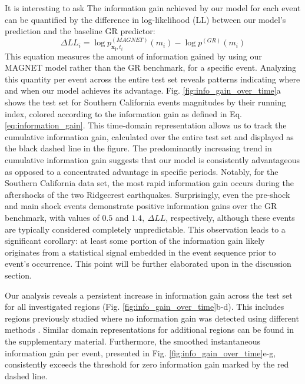 \documentclass[pdflatex]{sn-jnl}
\begin{document}
It is interesting to ask The information gain achieved by our model for each event can be quantified by the difference in log-likelihood (LL) between our model's prediction and the baseline GR predictor:
\begin{equation}
    \Delta LL_i = \log{p_{\pmb{x_i}, t_i}^{(MAGNET)}(m_i)} - \log{p^{(GR)}(m_i)}
    \label{eq:information_gain}
\end{equation}
This equation measures the amount of information gained by using our MAGNET model rather than the GR benchmark, for a specific event. Analyzing this quantity per event across the entire test set reveals patterns indicating where and when our model achieves its advantage. Fig. \ref{fig:info_gain_over_time}a shows the test set for Southern California events magnitudes by their running index, colored according to the information gain as defined in Eq. \ref{eq:information_gain}. This time-domain representation allows us to track the cumulative information gain, calculated over the entire test set and displayed as the black dashed line in the figure. The predominantly increasing trend in cumulative information gain suggests that our model is consistently advantageous as opposed to a concentrated advantage in specific periods. Notably, for the Southern California data set, the most rapid information gain occurs during the aftershocks of the two Ridgecrest earthquakes. Surprisingly, even the pre-shock and main shock events demonstrate positive information gains over the GR benchmark, with values of $0.5$ and $1.4, \ \Delta LL$, respectively, although these events are typically considered completely unpredictable. This observation leads to a significant corollary: at least some portion of the information gain likely originates from a statistical signal embedded in the event sequence prior to event's occurrence. This point will be further elaborated upon in the discussion section.
\newline

Our analysis reveals a persistent increase in information gain across the test set for all investigated regions (Fig. \ref{fig:info_gain_over_time}b-d). This includes regions previously studied where no information gain was detected using different methods  \cite{ogata_exploring_2018}. Similar domain representations for additional regions can be found in the supplementary material. Furthermore, the smoothed instantaneous information gain per event, presented in Fig. \ref{fig:info_gain_over_time}e-g, consistently exceeds the threshold for zero information gain marked by the red dashed line.
\end{document}

